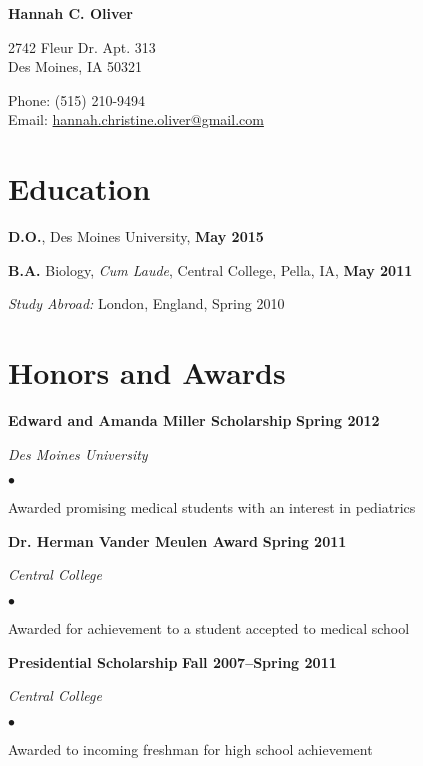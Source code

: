 \documentclass[10pt,letterpaper]{article}
\def\name{Hannah C. Oliver}
\renewenvironment{itemize}{
  \begin{list}{}{
      \setlength{\leftmargin}{1.5em}
      \setlength{\itemsep}{0.25em}
      \setlength{\parskip}{0pt}
      \setlength{\parsep}{0.25em}
    }
  }{
  \end{list}
}
\newenvironment{bitemize}{
  \begin{list}{$\bullet$}{
      \setlength{\leftmargin}{1.5em}
      \setlength{\itemsep}{0.25em}
      \setlength{\parskip}{0pt}
      \setlength{\parsep}{0.25em}
    }
  }{
  \end{list}
}
\newcommand{\yearrange}[1]{\hfill \textbf{#1} \par}
\begin{document}

\centerline{\huge \bf \name}

\bigskip

\begin{minipage}[t]{0.5\textwidth}
  2742 Fleur Dr. Apt. 313 \\
  Des Moines, IA 50321
\end{minipage}
\begin{minipage}[t]{0.5\textwidth}
  Phone: (515) 210-9494 \\
  Email: \href{mailto:hannah.christine.oliver@gmail.com}{hannah.christine.oliver@gmail.com}
\end{minipage}

\section*{Education}

\begin{itemize}
\item \textbf{D.O.}, Des Moines University, \yearrange{May 2015}
\item \textbf{B.A.} Biology, \textit{Cum Laude}, Central
  College, Pella, IA, \yearrange{May 2011}
  \begin{itemize} 
  \item \textit{Study Abroad:} London, England, Spring 2010
  \end{itemize}
\end{itemize}

\section*{Honors and Awards}
\begin{itemize}
\item \textbf{Edward and Amanda Miller Scholarship} \yearrange{Spring 2012}
  \textit{Des Moines University}
  \begin{bitemize}
    \item Awarded promising medical students with an interest in pediatrics
  \end{bitemize}
\item \textbf{Dr. Herman Vander Meulen Award} \yearrange{Spring 2011}
  \textit{Central College}
  \begin{bitemize}
    \item Awarded for achievement to a student accepted to medical school
  \end{bitemize}
	
\item \textbf{Presidential Scholarship} \yearrange{Fall 2007--Spring 2011}
  \textit{Central College}
  \begin{bitemize}
    \item Awarded to incoming freshman for high school achievement
  \end{bitemize}
\end{itemize}
\end{document}
